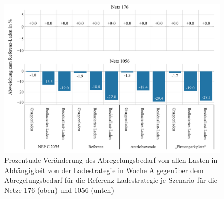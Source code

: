 \begin{figure}[H]
    \centering
    \includegraphics[width=\textwidth]{Bilder/176_1056_cur_load_grid_week_A}
    \caption{Prozentuale Veränderung des Abregelungsbedarf von allen Lasten in Abhängigkeit von der Ladestrategie in Woche A gegenüber dem Abregelungsbedarf für die Referenz-Ladestrategie je Szenario für die Netze \num{176} (oben) und \num{1056} (unten)}\label{fig:176_1056_cur_load_grid_week_A}
\end{figure}